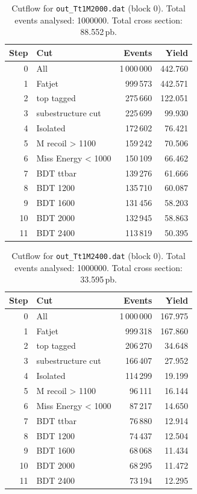 \documentclass{article}
\begin{document}
\begin{table}[H]
\centering
\begin{tabular}{r l r r}
\toprule
Step & Cut & Events & Yield \\
\midrule
0 & All & 1\,000\,000 & 442.760 \\
1 & Fatjet & 999\,573 & 442.571 \\
2 & top tagged & 275\,660 & 122.051 \\
3 & subestructure cut & 225\,699 & 99.930 \\
4 & Isolated & 172\,602 & 76.421 \\
5 & M recoil > 1100 & 159\,242 & 70.506 \\
6 & Miss Energy < 1000 & 150\,109 & 66.462 \\
7 & BDT ttbar & 139\,276 & 61.666 \\
8 & BDT 1200 & 135\,710 & 60.087 \\
9 & BDT 1600 & 131\,456 & 58.203 \\
10 & BDT 2000 & 132\,945 & 58.863 \\
11 & BDT 2400 & 113\,819 & 50.395 \\
\bottomrule
\end{tabular}
\caption{Cutflow for \texttt{out\_Tt1M2000.dat} (block 0). Total events analysed: 1000000. Total cross section: 88.552\,pb.}
\label{tab:cutflow-out-Tt1M2000-dat}
\end{table}

\begin{table}[H]
\centering
\begin{tabular}{r l r r}
\toprule
Step & Cut & Events & Yield \\
\midrule
0 & All & 1\,000\,000 & 167.975 \\
1 & Fatjet & 999\,318 & 167.860 \\
2 & top tagged & 206\,270 & 34.648 \\
3 & subestructure cut & 166\,407 & 27.952 \\
4 & Isolated & 114\,299 & 19.199 \\
5 & M recoil > 1100 & 96\,111 & 16.144 \\
6 & Miss Energy < 1000 & 87\,217 & 14.650 \\
7 & BDT ttbar & 76\,880 & 12.914 \\
8 & BDT 1200 & 74\,437 & 12.504 \\
9 & BDT 1600 & 68\,068 & 11.434 \\
10 & BDT 2000 & 68\,295 & 11.472 \\
11 & BDT 2400 & 73\,194 & 12.295 \\
\bottomrule
\end{tabular}
\caption{Cutflow for \texttt{out\_Tt1M2400.dat} (block 0). Total events analysed: 1000000. Total cross section: 33.595\,pb.}
\label{tab:cutflow-out-Tt1M2400-dat}
\end{table}
\end{document}
